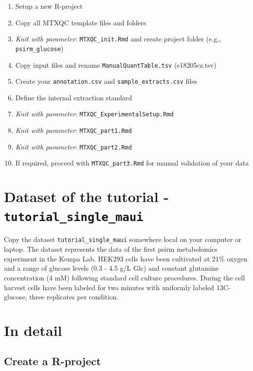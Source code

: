 \documentclass[]{book}
\providecommand{\tightlist}{%
  \setlength{\itemsep}{0pt}\setlength{\parskip}{0pt}}
\theoremstyle{definition}
\theoremstyle{definition}
\theoremstyle{definition}
\theoremstyle{remark}
\begin{document}
\begin{enumerate}
\def\labelenumi{\arabic{enumi}.}
\tightlist
\item
  Setup a new R-project
\item
  Copy all MTXQC template files and folders
\item
  \emph{Knit with parameter}: \texttt{MTXQC\_init.Rmd} and create
  project folder (e.g., \texttt{psirm\_glucose})
\item
  Copy input files and rename \texttt{ManualQuantTable.tsv}
  (e18205cz.tsv)
\item
  Create your \texttt{annotation.csv} and \texttt{sample\_extracts.csv}
  files
\item
  Define the internal extraction standard
\item
  \emph{Knit with parameter}: \texttt{MTXQC\_ExperimentalSetup.Rmd}
\item
  \emph{Knit with parameter}: \texttt{MTXQC\_part1.Rmd}
\item
  \emph{Knit with parameter}: \texttt{MTXQC\_part2.Rmd}
\item
  If required, proceed with \texttt{MTXQC\_part3.Rmd} for manual
  validation of your data
\end{enumerate}

\section{\texorpdfstring{Dataset of the tutorial -
\texttt{tutorial\_single\_maui}}{Dataset of the tutorial - tutorial\_single\_maui}}\label{dataset-of-the-tutorial---tutorial_single_maui}

Copy the dataset \texttt{tutorial\_single\_maui} somewhere local on your
computer or laptop. The dataset represents the data of the first psirm
metabolomics experiment in the Kempa Lab. HEK293 cells have been
cultivated at 21\% oxygen and a range of glucose levels (0.3 - 4.5 g/L
Glc) and constant glutamine concentration (4 mM) following standard cell
culture procedures. During the cell harvest cells have been labeled for
two minutes with uniformly labeled 13C-glucose, three replicates per
condition.

\section{In detail}\label{indetail-maui}

\subsection{Create a R-project}\label{create-a-r-project}
\end{document}

